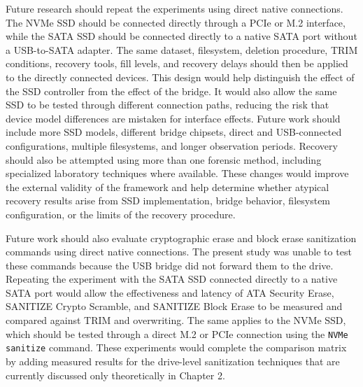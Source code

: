 Future research should repeat the experiments using direct native connections. The NVMe SSD should be connected directly through a PCIe or M.2 interface, while the SATA 
SSD should be connected directly to a native SATA port without a USB-to-SATA adapter. The same dataset, filesystem, deletion procedure, TRIM conditions, recovery tools, 
fill levels, and recovery delays should then be applied to the directly connected devices. This design would help distinguish the effect of the SSD controller from the 
effect of the bridge. It would also allow the same SSD to be tested through different connection paths, reducing the risk that device model differences are mistaken for 
interface effects. Future work should include more SSD models, different bridge chipsets, direct and USB-connected configurations, multiple filesystems, and longer 
observation periods. Recovery should also be attempted using more than one forensic method, including specialized laboratory techniques where available. These changes 
would improve the external validity of the framework and help determine whether atypical recovery results arise from SSD implementation, bridge behavior, filesystem 
configuration, or the limits of the recovery procedure.

Future work should also evaluate cryptographic erase and block erase sanitization commands using direct native connections. The present study was unable to test these 
commands because the USB bridge did not forward them to the drive. Repeating the experiment with the SATA SSD connected directly to a native SATA port would allow the 
effectiveness and latency of ATA Security Erase, SANITIZE Crypto Scramble, and SANITIZE Block Erase to be measured and compared against TRIM and overwriting. The same 
applies to the NVMe SSD, which should be tested through a direct M.2 or PCIe connection using the \texttt{NVMe sanitize} command. These experiments would complete the 
comparison matrix by adding measured results for the drive-level sanitization techniques that are currently discussed only theoretically in Chapter 2.

